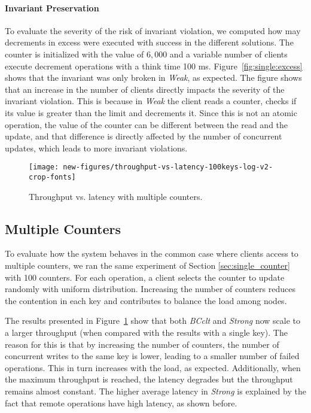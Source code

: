 \documentclass[conference]{IEEEtran}
\begin{document}
\paragraph{Invariant Preservation}
To evaluate the severity of the risk of invariant violation,
we computed how may decrements in excess were executed with success in the different solutions. 
The counter is initialized with the value of $6,000$ and a variable number of clients 
execute decrement operations with a think time 100 ms.
Figure~\ref{fig:single:excess} shows that the invariant was only broken in \emph{Weak}, as expected.
The figure shows that an increase in the number of clients directly impacts the severity of
the invariant violation. This is because
in \emph{Weak} the client reads a counter, checks if its value is greater than 
the limit and decrements it.
Since this is not an atomic operation, the value of the counter can be different between 
the read and the update, and that difference is directly affected by the number of concurrent updates,
which leads to more invariant violations.





\begin{figure}[t]\centering
\texttt{[image: new-figures/throughput-vs-latency-100keys-log-v2-crop-fonts]}
\vspace{-1ex}
\caption{Throughput vs. latency with multiple counters.}
\label{fig:multiple:throughput}
\end{figure}

\subsection{Multiple Counters}

To evaluate how the system behaves in the common case where clients access to
multiple counters, we ran the same experiment of 
Section \ref{sec:single_counter} with 100 counters.
For each operation, a client selects the counter to update randomly
with uniform distribution. 
Increasing the number of counters reduces the contention in each key and 
contributes to balance the load among nodes.

The results presented in Figure~\ref{fig:multiple:throughput} show that 
both \emph{BCclt} and \emph{Strong} now scale to a larger throughput (when
compared with the results with a single key). 
The reason for this is that by increasing the number of counters, the 
number of concurrent writes to the same key is lower, leading
to a smaller number of failed operations.
This in turn increases with the load, as expected. 
Additionally, when the maximum throughput is reached, the
latency degrades but the throughput remains almost constant. 
The higher average latency in \emph{Strong} is explained by the fact that remote
operations have high latency, as shown before.
\end{document}

